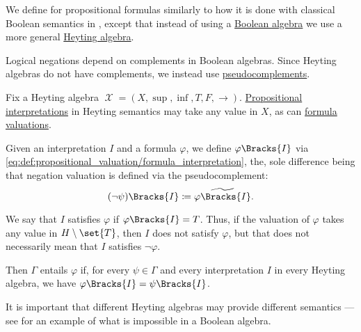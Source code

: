 \begin{definition}\label{def:propositional_heyting_algebra_semantics}
  We define  for propositional formulas similarly to how it is done with classical Boolean semantics in , except that instead of using a \hyperref[def:boolean_algebra]{Boolean algebra} we use a more general \hyperref[def:heyting_algebra]{Heyting algebra}.

  Logical negations depend on complements in Boolean algebras. Since Heyting algebras do not have complements, we instead use \hyperref[def:heyting_algebra/pseudocomplement]{pseudocomplements}.

  Fix a Heyting algebra \( \mscrX = (X, \sup, \inf, T, F, \rightarrow) \). \hyperref[def:propositional_valuation/interpretation]{Propositional interpretations} in Heyting semantics may take any value in \( X \), as can \hyperref[def:propositional_valuation/formula_valuation]{formula valuations}.

  Given an interpretation \( I \) and a formula \( \varphi \), we define \( \varphi\Bracks{I} \) via \eqref{eq:def:propositional_valuation/formula_interpretation}, the, sole difference being that negation valuation is defined via the pseudocomplement:
  \begin{equation*}
    (\neg \psi)\Bracks{I} \coloneqq \widetilde{\varphi\Bracks{I}}.
  \end{equation*}

  We say that \( I \) satisfies \( \varphi \) if \( \varphi\Bracks{I} = T \). Thus, if the valuation of \( \varphi \) takes any value in \( H \setminus \set{ T } \), then \( I \) does not satisfy \( \varphi \), but that does not necessarily mean that \( I \) satisfies \( \neg \varphi \).

  Then \( \Gamma \) entails \( \varphi \) if, for every \( \psi \in \Gamma \) and every interpretation \( I \) in every Heyting algebra, we have \( \varphi\Bracks{I} = \psi\Bracks{I} \).

  It is important that different Heyting algebras may provide different semantics --- see  for an example of what is impossible in a Boolean algebra.
\end{definition}

